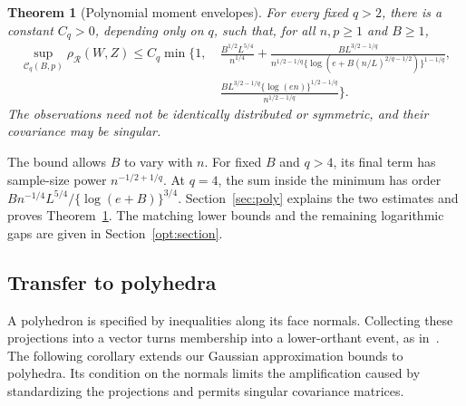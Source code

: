\documentclass[11pt,letterpaper]{article}
\newenvironment{recovered}{\color{magenta}}{}
\newtheorem{theorem}{Theorem}
\theoremstyle{remark}
\newcommand{\rh}{\rho_{\mathcal R}}
\begin{document}
\begin{theorem}[Polynomial moment envelopes]\label{thm:polynomial}
For every fixed \(q>2\), there is a constant \(C_q>0\), depending
only on \(q\), such that, for all \(n,p\ge1\) and \(B\ge1\),
\begin{equation}
\begin{aligned}
 \sup_{\mathcal C_q(B,p)}\rh(W,Z)
 \le C_q\min\Bigg\{1,\ &
 \frac{B^{1/2}L^{5/4}}{n^{1/4}}
 +\frac{B L^{3/2-1/q}}
 {n^{1/2-1/q}\{\log(e+B(n/L)^{2/q-1/2})\}^{1-1/q}},\\
 &\frac{B L^{3/2-1/q}\{\log(en)\}^{1/2-1/q}}
 {n^{1/2-1/q}}\Bigg\}.
\end{aligned}
 \label{poly:combined}
\end{equation}
The observations need not be identically distributed or symmetric,
and their covariance may be singular.
\end{theorem}

The bound allows \(B\) to vary with \(n\). For fixed \(B\) and
\(q>4\), its final term has sample-size power \(n^{-1/2+1/q}\).
At \(q=4\), the sum inside the minimum has order
\(Bn^{-1/4}L^{5/4}/\{\log(e+B)\}^{3/4}\).
Section~\ref{sec:poly} explains the two estimates and proves
Theorem~\ref{thm:polynomial}. The matching lower bounds and the
remaining logarithmic gaps are given in Section~\ref{opt:section}.

\subsection{Transfer to polyhedra}\label{sec:polyhedral-transfer}

A polyhedron is specified by inequalities along its face normals.
Collecting these projections into a vector turns membership into a
lower-orthant event, as in~\cite[Section~3.1]{CCK2017}.
\begin{recovered}
The following corollary extends our Gaussian approximation bounds to
polyhedra. Its condition on the normals limits the amplification caused
by standardizing the projections and permits singular covariance matrices.
\end{recovered}
\end{document}
